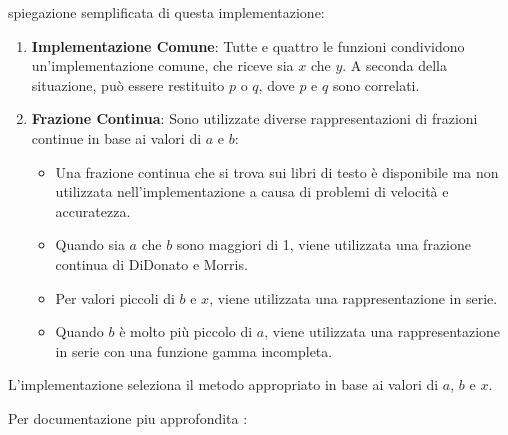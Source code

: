 \documentclass{article}
\begin{document}
spiegazione semplificata di questa implementazione:

\begin{enumerate}
  \item \textbf{Implementazione Comune}: Tutte e quattro le funzioni condividono un'implementazione comune, che riceve sia $x$ che $y$. A seconda della situazione, può essere restituito $p$ o $q$, dove $p$ e $q$ sono correlati.
  
  \item \textbf{Frazione Continua}: Sono utilizzate diverse rappresentazioni di frazioni continue in base ai valori di $a$ e $b$:
    \begin{itemize}
      \item Una frazione continua che si trova sui libri di testo è disponibile ma non utilizzata nell'implementazione a causa di problemi di velocità e accuratezza.
      \item Quando sia $a$ che $b$ sono maggiori di 1, viene utilizzata una frazione continua di DiDonato e Morris.
      \item Per valori piccoli di $b$ e $x$, viene utilizzata una rappresentazione in serie.
      \item Quando $b$ è molto più piccolo di $a$, viene utilizzata una rappresentazione in serie con una funzione gamma incompleta.
    \end{itemize}

\end{enumerate}

L'implementazione seleziona il metodo appropriato in base ai valori di $a$, $b$ e $x$.

Per documentazione piu approfondita :
\end{document}
